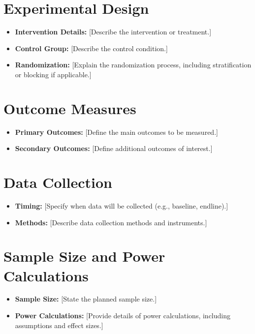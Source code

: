 \documentclass[
  letterpaper,
  DIV=11,
  numbers=noendperiod]{scrartcl}
\providecommand{\tightlist}{%
  \setlength{\itemsep}{0pt}\setlength{\parskip}{0pt}}\usepackage{longtable,booktabs,array}
\begin{document}
\section{Experimental Design}\label{experimental-design}

\begin{itemize}
\tightlist
\item
  \textbf{Intervention Details:} {[}Describe the intervention or
  treatment.{]}
\item
  \textbf{Control Group:} {[}Describe the control condition.{]}
\item
  \textbf{Randomization:} {[}Explain the randomization process,
  including stratification or blocking if applicable.{]}
\end{itemize}

\section{Outcome Measures}\label{outcome-measures}

\begin{itemize}
\tightlist
\item
  \textbf{Primary Outcomes:} {[}Define the main outcomes to be
  measured.{]}
\item
  \textbf{Secondary Outcomes:} {[}Define additional outcomes of
  interest.{]}
\end{itemize}

\section{Data Collection}\label{data-collection}

\begin{itemize}
\tightlist
\item
  \textbf{Timing:} {[}Specify when data will be collected (e.g.,
  baseline, endline).{]}
\item
  \textbf{Methods:} {[}Describe data collection methods and
  instruments.{]}
\end{itemize}

\section{Sample Size and Power
Calculations}\label{sample-size-and-power-calculations}

\begin{itemize}
\tightlist
\item
  \textbf{Sample Size:} {[}State the planned sample size.{]}
\item
  \textbf{Power Calculations:} {[}Provide details of power calculations,
  including assumptions and effect sizes.{]}
\end{itemize}
\end{document}
